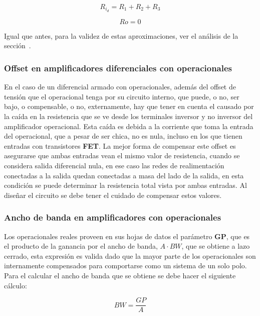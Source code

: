 \begin{equation}
\boxed{R_{i_{d}} = R_{1} + R_{2} + R_{3}}
\end{equation}


\begin{equation}
\boxed{R{o} = 0}
\end{equation}

Igual que antes, para la validez de estas aproximaciones, ver el análisis de la sección~.


\subsubsection{Offset en amplificadores diferenciales con operacionales}

En el caso de un diferencial armado con operacionales, además del offset de tensión que el operacional tenga por su circuito interno, que puede, o no, ser bajo, o compensable, o no, externamente, hay que tener en cuenta el causado por la caída en la resistencia que se ve desde los terminales inversor y no inversor del amplificador operacional. Esta caída es debida a la corriente que toma la entrada del operacional, que a pesar de ser chica, no es nula, incluso en los que tienen entradas con transistores \textbf{FET}. La mejor forma de compensar este offset es asegurarse que ambas entradas vean el mismo valor de resistencia, cuando se considera salida diferencial nula, en ese caso las redes de realimentación conectadas a la salida quedan conectadas a masa del lado de la salida, en esta condición se puede determinar la resistencia total vista por ambas entradas. Al diseñar el circuito se debe tener el cuidado de compensar estos valores.


\subsubsection{Ancho de banda en amplificadores con operacionales}

Los operacionales reales proveen en sus hojas de datos el parámetro \textbf{GP}, que es el producto de la ganancia  por el ancho de banda, $A \cdot BW$, que se obtiene a lazo cerrado, esta expresión es valida dado que la mayor parte de los operacionales son internamente compensados para comportarse como un sistema de un solo polo. Para el calcular el ancho de banda que se obtiene se debe hacer el siguiente cálculo:

\begin{equation}
\boxed{BW = \frac{GP}{A}}
\end{equation}



